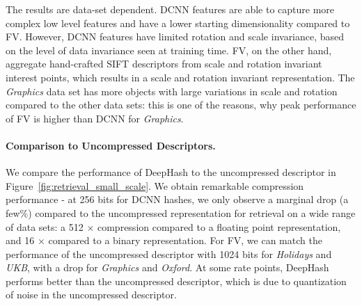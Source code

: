 \documentclass[10pt,twocolumn,letterpaper]{article}
\begin{document}
The results are data-set dependent. 
DCNN features are able to capture more complex low level features and have a lower starting dimensionality compared to FV. 
However, DCNN features have limited rotation and scale invariance, based on the level of data invariance seen at training time.
FV, on the other hand, aggregate hand-crafted SIFT descriptors from scale and rotation invariant interest points, which results in a scale and rotation invariant representation.
The {\it Graphics} data set has more objects with large variations in scale and rotation compared to the other data sets: this is one of the reasons, why peak performance of FV is higher than DCNN for {\it Graphics}.





\vspace{-0.1em}
\paragraph{Comparison to Uncompressed Descriptors.}
We compare the performance of DeepHash to the uncompressed descriptor in Figure~\ref{fig:retrieval_small_scale}.
We obtain remarkable compression performance - at 256 bits for DCNN hashes, we only observe a marginal drop (a few$\%$) compared to the uncompressed representation for retrieval on a wide range of data sets: a 512 $\times$ compression compared to a floating point representation, and 16 $\times$ compared to a binary representation.
For FV, we can match the performance of the uncompressed descriptor with 1024 bits for {\it Holidays} and {\it UKB}, with a  drop for {\it Graphics} and {\it Oxford}. 
At some rate points, DeepHash performs better than the uncompressed descriptor, which is due to quantization of noise in the uncompressed descriptor.
\end{document}
